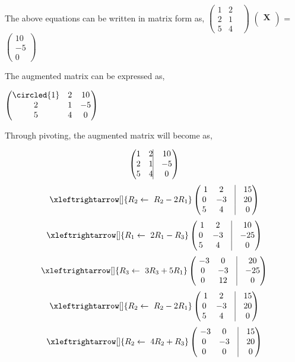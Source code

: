\documentclass[journal,12pt,twocolumn]{article}
\let\vec\mathbf
\newcommand{\myvec}[1]{\ensuremath{\begin{pmatrix}#1\end{pmatrix}}}
\begin{document}
The above equations can be written in matrix form as,
\center
\myvec{ 1& 2 & \\ 2 & 1 & \\ 5 & 4 &} \myvec{\vec{X} \\} = \myvec{10\\-5\\0} \\
\vspace{0.3cm}
\begin{flushleft}
The augmented matrix can be expressed as,
\end{flushleft}
\myvec{ \circled{1} & 2 & 10 \\ 2 & 1  & -5 \\ 5 & 4   & 0} \\
\begin{flushleft}
Through pivoting, the augmented matrix will become as,
\end{flushleft}
\begin{align}
			    
			    \myvec{
				    1 & 2 \vrule & 10
			    \\
			    2 & 1  \vrule & -5
			    \\
			    5 & 4 \vrule & 0}
\end{align}
\begin{align}
 \xleftrightarrow[]{R_2 \leftarrow \ R_2-2R_1}
		\myvec{
    \ 1 & 2 & \vrule & 15
			    \\
0 & -3  &\vrule & 20
\\
5 & 4  &\vrule & 0
		    }
\end{align}
\begin{align}
 			\xleftrightarrow[]{R_1 \leftarrow \ 2R_1-R_3}
			    \myvec{
				    \ 1 & 2&\vrule & 10
			    \\
			    0 & -3 &\vrule & -25
			    \\
			    5 & 4 &\vrule & 0
		    }
\end{align}
\begin{align}
 			\xleftrightarrow[]{R_3 \leftarrow \ 3R_3+5R_1}
			    \myvec{
				    \ -3 & 0&\vrule & 20
			    \\
			    0 & -3 &\vrule & -25
			    \\
			    0 & 12 &\vrule & 0
		    }
\end{align}
\begin{align}
 \xleftrightarrow[]{R_2 \leftarrow \ R_2-2R_1}
		\myvec{
    \ 1 & 2 & \vrule & 15
			    \\
0 & -3  &\vrule & 20
\\
5 & 4  &\vrule & 0
		    }
\end{align}
\begin{align}
 \xleftrightarrow[]{R_2 \leftarrow \ 4R_2+R_3}
		\myvec{
    \ -3 & 0 & \vrule & 15
			    \\
0 & -3  &\vrule & 20
\\
0 & 0  &\vrule & 0
		    }
\end{align}
\end{document}
